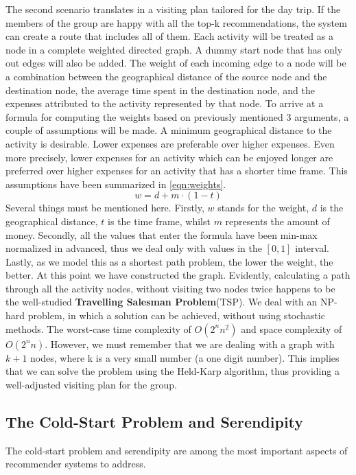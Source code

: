 \documentclass[11pt,a4paper,oneside]{article}
\begin{document}
The second scenario translates in a visiting plan tailored for the day trip. If the members of the group are happy with all the top-k recommendations, the system can create a route that includes all of them. Each activity will be treated as a node in a complete weighted directed graph. A dummy start node that has only out edges will also be added. The weight of each incoming edge to a node will be a combination between the geographical distance of the source node and the destination node, the average time spent in the destination node, and the expenses attributed to the activity represented by that node. To arrive at a formula for computing the weights based on previously mentioned 3 arguments, a couple of assumptions will be made. A minimum geographical distance to the activity is desirable. Lower expenses are preferable over higher expenses. Even more precisely, lower expenses for an activity which can be enjoyed longer are preferred over higher expenses for an activity that has a shorter time frame. This assumptions have been summarized in \autoref{eqn:weights}.
\begin{equation}
    \label{eqn:weights}
    w = d + m \cdot (1 - t)
\end{equation}
Several things must be mentioned here. Firstly, $w$ stands for the weight, $d$ is the geographical distance, $t$ is the time frame, whilst $m$ represents the amount of money. Secondly, all the values that enter the formula have been min-max normalized in advanced, thus we deal only with values in the $[0, 1]$ interval. Lastly, as we model this as a shortest path problem, the lower the weight, the better. At this point we have constructed the graph. Evidently, calculating a path through all the activity nodes, without visiting two nodes twice happens to be the well-studied \textbf{Travelling Salesman Problem}(TSP). We deal with an NP-hard problem, in which a solution can be achieved, without using stochastic methods. The worst-case time complexity of $O(2^nn^2)$ and space complexity of $O(2^nn)$. However, we must remember that we are dealing with a graph with $k+1$ nodes, where k is a very small number (a one digit number). This implies that we can solve the problem using the Held-Karp algorithm, thus providing a well-adjusted visiting plan for the group.\cite{held_DynamicProgrammingApproach_1962}

\subsection{The Cold-Start Problem and Serendipity}
The cold-start problem and serendipity are among the most important aspects of recommender systems to address. 
\end{document}
